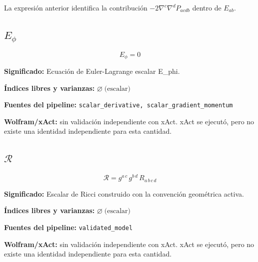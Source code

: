 \documentclass[11pt]{article}
\begin{document}
\par\vspace{0.8\baselineskip}\noindent
\begin{minipage}{\linewidth}
La expresión anterior identifica la contribución $-2\nabla^c\nabla^dP_{acdb}$ dentro de $E_{ab}$.\par
\end{minipage}
\subsection*{$ E_{\phi} $}
\begin{dmath*}[breakdepth={5}]
E_{\phi} = 0
\end{dmath*}
\par\vspace{1.2\baselineskip}\noindent
\begin{minipage}{\linewidth}
\textbf{Significado:} Ecuación de Euler-Lagrange escalar E\_phi.\par
\textbf{Índices libres y varianzas:} $ \varnothing\;\text{(escalar)} $\par
\textbf{Fuentes del pipeline:} \texttt{scalar\_derivative, scalar\_gradient\_momentum}\par
\textbf{Wolfram/xAct:} sin validación independiente con xAct. xAct se ejecutó, pero no existe una identidad independiente para esta cantidad.\par
\end{minipage}
\subsection*{$ \mathcal{R} $}
\begin{dmath*}[breakdepth={5}]
\mathcal{R} = g{}^{a\,c}\,g{}^{b\,d}\,R{}_{a\,b\,c\,d}
\end{dmath*}
\par\vspace{1.2\baselineskip}\noindent
\begin{minipage}{\linewidth}
\textbf{Significado:} Escalar de Ricci construido con la convención geométrica activa.\par
\textbf{Índices libres y varianzas:} $ \varnothing\;\text{(escalar)} $\par
\textbf{Fuentes del pipeline:} \texttt{validated\_model}\par
\textbf{Wolfram/xAct:} sin validación independiente con xAct. xAct se ejecutó, pero no existe una identidad independiente para esta cantidad.\par
\end{minipage}
\end{document}

